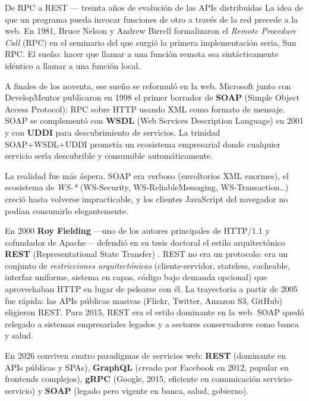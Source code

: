 \begin{cajahistoria}{De RPC a REST --- treinta años de evolución de las APIs distribuidas}
La idea de que un programa pueda invocar funciones de otro a través
de la red precede a la web. En 1981, Bruce Nelson y Andrew Birrell
formalizaron el \emph{Remote Procedure Call} (RPC) en el seminario
del que surgió la primera implementación seria, Sun RPC. El sueño:
hacer que llamar a una función remota sea sintácticamente idéntico
a llamar a una función local.

A finales de los noventa, ese sueño se reformuló en la web. Microsoft
junto con DevelopMentor publicaron en 1998 el primer borrador de
\textbf{SOAP} (Simple Object Access Protocol): RPC sobre HTTP usando
XML como formato de mensaje. SOAP se complementó con \textbf{WSDL}
(Web Services Description Language) en 2001 y con \textbf{UDDI} para
descubrimiento de servicios. La trinidad SOAP+WSDL+UDDI prometía un
ecosistema empresarial donde cualquier servicio sería descubrible y
consumible automáticamente.

La realidad fue más áspera. SOAP era verboso (envoltorios XML
enormes), el ecosistema de \emph{WS-*} (WS-Security, WS-ReliableMessaging,
WS-Transaction\dots) creció hasta volverse impracticable, y los
clientes JavaScript del navegador no podían consumirlo elegantemente.

En 2000 \textbf{Roy Fielding} —uno de los autores principales de
HTTP/1.1 y cofundador de Apache— defendió en su tesis doctoral el
estilo arquitectónico \textbf{REST} (Representational State Transfer)
\cite{fielding2000rest}. REST no era un protocolo: era un conjunto de
\emph{restricciones arquitectónicas} (cliente-servidor, stateless,
cacheable, interfaz uniforme, sistema en capas, código bajo demanda
opcional) que aprovechaban HTTP en lugar de pelearse con él. La
trayectoria a partir de 2005 fue rápida: las APIs públicas masivas
(Flickr, Twitter, Amazon S3, GitHub) eligieron REST. Para 2015, REST
era el estilo dominante en la web. SOAP quedó relegado a sistemas
empresariales legados y a sectores conservadores como banca y salud.

En 2026 conviven cuatro paradigmas de servicios web: \textbf{REST}
(dominante en APIs públicas y SPAs), \textbf{GraphQL} (creado por
Facebook en 2012, popular en frontends complejos), \textbf{gRPC}
(Google, 2015, eficiente en comunicación servicio-servicio) y
\textbf{SOAP} (legado pero vigente en banca, salud, gobierno).
\end{cajahistoria}

